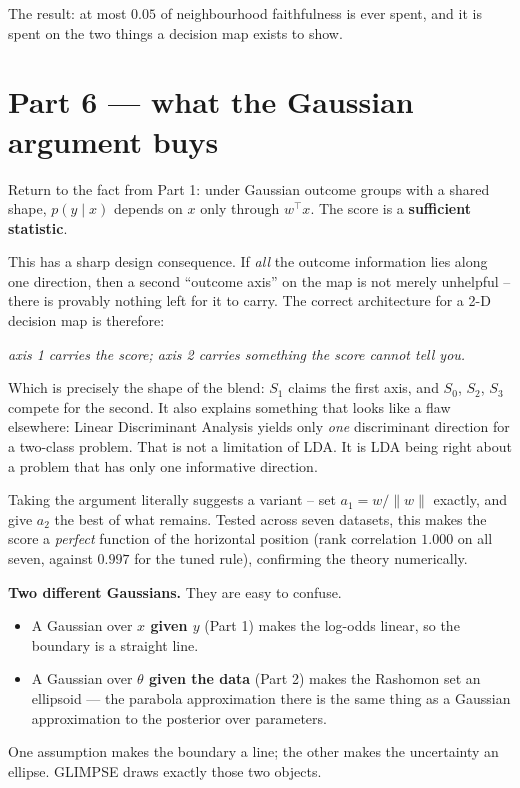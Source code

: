 \documentclass[11pt]{article}
\begin{document}
The result: at most $0.05$ of neighbourhood faithfulness is ever spent, and it is spent
on the two things a decision map exists to show.

\section{Part 6 --- what the Gaussian argument buys}

Return to the fact from Part 1: under Gaussian outcome groups with a shared shape,
$p(y \mid x)$ depends on $x$ only through $w^\top x$. The score is a \textbf{sufficient
statistic}.

This has a sharp design consequence. If \emph{all} the outcome information lies along
one direction, then a second ``outcome axis'' on the map is not merely unhelpful --
there is provably nothing left for it to carry. The correct architecture for a 2-D
decision map is therefore:

\begin{center}
\emph{axis 1 carries the score; axis 2 carries something the score cannot tell you.}
\end{center}

Which is precisely the shape of the blend: $S_1$ claims the first axis, and $S_0$,
$S_2$, $S_3$ compete for the second. It also explains something that looks like a flaw
elsewhere: Linear Discriminant Analysis yields only \emph{one} discriminant direction
for a two-class problem. That is not a limitation of LDA. It is LDA being right about a
problem that has only one informative direction.

Taking the argument literally suggests a variant -- set $a_1 = w / \|w\|$ exactly, and
give $a_2$ the best of what remains. Tested across seven datasets, this makes the score
a \emph{perfect} function of the horizontal position (rank correlation $1.000$ on all
seven, against $0.997$ for the tuned rule), confirming the theory numerically.

\begin{keybox}
\textbf{Two different Gaussians.} They are easy to confuse.
\begin{itemize}[leftmargin=*, itemsep=1pt]
  \item A Gaussian over \textbf{$x$ given $y$} (Part 1) makes the log-odds linear, so
        the boundary is a straight line.
  \item A Gaussian over \textbf{$\theta$ given the data} (Part 2) makes the Rashomon
        set an ellipsoid --- the parabola approximation there is the same thing as a
        Gaussian approximation to the posterior over parameters.
\end{itemize}
One assumption makes the boundary a line; the other makes the uncertainty an ellipse.
GLIMPSE draws exactly those two objects.
\end{keybox}
\end{document}
